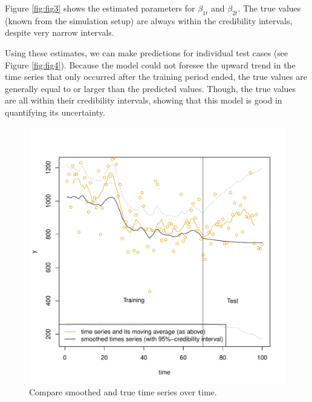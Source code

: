 \documentclass{article}
\begin{document}
Figure \ref{fig:fig3} shows the estimated parameters for $\beta_{1t}$ and $\beta_{2t}$. The true values (known from the simulation setup) are always within the credibility intervals, despite very narrow intervals.

Using these estimates, we can make predictions for individual test cases (see Figure \ref{fig:fig4}). Because the model could not foresee the upward trend in the time series that only occurred after the training period ended, the true values are generally equal to or larger than the predicted values. Though, the true values are all within their credibility intervals, showing that this model is good in quantifying its uncertainty.

\begin{figure}
	\centering
	\includegraphics[width=\textwidth]{smoothed_time_series.pdf}
	\caption{Compare smoothed and true time series over time.}
	\label{fig:fig2}
\end{figure}
\end{document}
